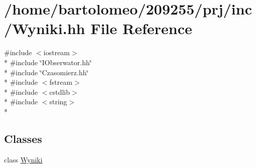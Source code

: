 \hypertarget{_wyniki_8hh}{\section{/home/bartolomeo/209255/prj/inc/\-Wyniki.hh File Reference}
\label{_wyniki_8hh}
}
{\ttfamily \#include $<$iostream$>$}\\*
{\ttfamily \#include \char`\"{}I\-Obserwator.\-hh\char`\"{}}\\*
{\ttfamily \#include \char`\"{}Czasomierz.\-hh\char`\"{}}\\*
{\ttfamily \#include $<$fstream$>$}\\*
{\ttfamily \#include $<$cstdlib$>$}\\*
{\ttfamily \#include $<$string$>$}\\*
\subsection*{Classes}
\begin{DoxyCompactItemize}
\item 
class \hyperlink{class_wyniki}{Wyniki}
\end{DoxyCompactItemize}
